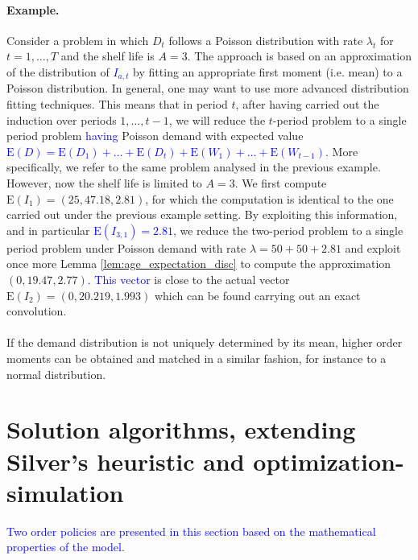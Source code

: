 \documentclass{tPRS2e}
\newcommand{\blue}{\textcolor{blue}}
\begin{document}
	\paragraph*{\bf Example.} Consider a problem in which $D_t$ follows a Poisson distribution with rate $\lambda_t$ for $t=1,\ldots,T$ and the shelf life is $A=3$. The approach is based on an approximation of the distribution of \blue{$I_{a,t}$} by fitting an appropriate first moment (i.e. mean) to a Poisson distribution. In general, one may want to use more advanced distribution fitting techniques. This means that in period $t$, after having carried out the induction over periods $1,\ldots,t-1$, we will reduce the $t$-period problem to a single period problem \blue{having} Poisson demand with expected value \blue{$\mathrm{E}(D)=\mathrm{E}(D_1)+\ldots+\mathrm{E}(D_t)+\mathrm{E}(W_{1})+\ldots+\mathrm{E}(W_{t-1})$.} More specifically, we refer to the same problem analysed in the previous example. However, now the shelf life is limited to $A=3$. We first compute $\mathrm{E}(I_1)=(25, 47.18, 2.81)$, for which the computation is identical to the one carried out under the previous example setting. By exploiting this information, and in particular \blue{$\mathrm{E}(I_{3,1})=2.81$}, we reduce the two-period problem to a single period problem under Poisson demand with rate $\lambda=50+50+2.81$ and exploit once more Lemma  \ref{lem:age_expectation_disc} to compute the approximation $(0, 19.47, 2.77)$\blue{. This vector} is close to the actual vector $\mathrm{E}(I_2)=(0, 20.219, 1.993)$ which can be found carrying out an exact convolution.
	
	\paragraph*{}
	If the demand distribution is not uniquely determined by its mean, higher order moments can be obtained and matched in a similar fashion, for instance to a normal distribution.
	
	
	\section{Solution algorithms, extending Silver's heuristic and optimization-simulation}
	\label{sec:silversanalytic}
%	
\blue{Two order policies are presented in this section based on the mathematical properties of the model}.
\end{document}
